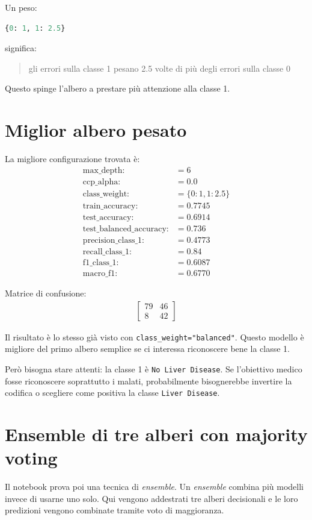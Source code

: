 \documentclass[11pt,a4paper]{article}
\begin{document}
Un peso:
\begin{lstlisting}[language=Python]
{0: 1, 1: 2.5}
\end{lstlisting}

significa:
\begin{quote}
    gli errori sulla classe 1 pesano 2.5 volte di più degli errori sulla classe 0
\end{quote}

Questo spinge l'albero a prestare più attenzione alla classe 1.

\section{Miglior albero pesato}
La migliore configurazione trovata è:
\begin{align*}
    \text{max\_depth:} &= 6 \\
    \text{ccp\_alpha:} &= 0.0 \\
    \text{class\_weight:} &= \{0: 1, 1: 2.5\} \\
    \text{train\_accuracy:} &= 0.7745 \\
    \text{test\_accuracy:} &= 0.6914 \\
    \text{test\_balanced\_accuracy:} &= 0.736 \\
    \text{precision\_class\_1:} &= 0.4773 \\
    \text{recall\_class\_1:} &= 0.84 \\
    \text{f1\_class\_1:} &= 0.6087 \\
    \text{macro\_f1:} &= 0.6770
\end{align*}

Matrice di confusione:
\begin{align*}
    \begin{bmatrix}
        79 & 46 \\
        8 & 42
    \end{bmatrix}
\end{align*}

Il risultato è lo stesso già visto con \texttt{class\_weight="balanced"}. Questo modello è migliore del primo albero semplice se ci interessa riconoscere bene la classe 1.

Però bisogna stare attenti: la classe 1 è \texttt{No Liver Disease}. Se l'obiettivo medico fosse riconoscere soprattutto i malati, probabilmente bisognerebbe invertire la codifica o scegliere come positiva la classe \texttt{Liver Disease}.

\section{Ensemble di tre alberi con majority voting}
Il notebook prova poi una tecnica di \textit{ensemble}. Un \textit{ensemble} combina più modelli invece di usarne uno solo. Qui vengono addestrati tre alberi decisionali e le loro predizioni vengono combinate tramite voto di maggioranza.
\end{document}
